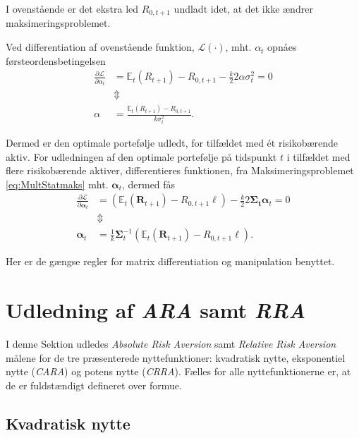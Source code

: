 \documentclass[
  a4paper,
  oneside]{memoir}
\begin{document}
I ovenstående er det ekstra led \(R_{0,t+1}\) undladt idet, at det ikke ændrer maksimeringsproblemet.

Ved differentiation af ovenstående funktion, \(\mathcal{L}(\cdot)\), mht. \(\alpha_t\) opnåes førsteordensbetingelsen
\begin{align*}
\frac{\partial \mathcal{L}}{\partial \alpha_t} &= \mathbb{E}_t(R_{t+1}) - R_{0,t+1} - \frac{k}{2}2\alpha\sigma_t^2=0\\
&\Updownarrow\\
\alpha&=\frac{\mathbb{E}_t\left(R_{t+1}\right)-R_{0,t+1}}{k\sigma_t^2}.
\end{align*}

Dermed er den optimale portefølje udledt, for tilfældet med ét risikobærende aktiv. For udledningen af den optimale portefølje på tidspunkt \(t\) i tilfældet med flere risikobærende aktiver, differentieres funktionen, fra Maksimeringsproblemet \eqref{eq:MultStatmaks} mht. \(\bm{\alpha}_t\), dermed fås
\begin{align*}
\frac{\partial \mathcal{L}}{\partial \bm{\alpha}_t} &= (\mathbb{E}_t(\bm{R}_{t+1})- R_{0,t+1}\bm{\ell}) - \frac{k}{2}2\bm{\Sigma_t}\bm{\alpha}_t = 0\\
&\Updownarrow\\
\bm{\alpha}_t&=\frac{1}{k}\bm{\Sigma}_t^{-1}(\mathbb{E}_t(\bm{R}_{t+1})-R_{0,t+1}\bm{\ell}).
\end{align*}

Her er de gængse regler for matrix differentiation og manipulation benyttet.

\hypertarget{udledning-af-ara-samt-rra}{%
\section{\texorpdfstring{Udledning af \emph{ARA} samt \emph{RRA}}{Udledning af ARA samt RRA}}\label{udledning-af-ara-samt-rra}}

I denne Sektion udledes \emph{Absolute Risk Aversion} samt \emph{Relative Risk Aversion} målene for de tre præsenterede nyttefunktioner: kvadratisk nytte, eksponentiel nytte (\emph{CARA}) og potens nytte (\emph{CRRA}). Fælles for alle nyttefunktionerne er, at de er fuldstændigt defineret over formue.

\hypertarget{kvadratisk-nytte-1}{%
\subsection{Kvadratisk nytte}\label{kvadratisk-nytte-1}}
\end{document}
